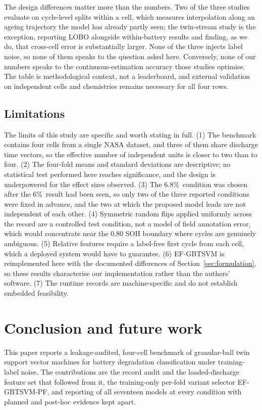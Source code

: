 \documentclass[final,5p,times,twocolumn]{elsarticle}
\newcommand{\proposed}{EF-GBTSVM-PF}
\newcommand{\nz}{\%}
\begin{document}
The design differences matter more than the numbers. Two of the three studies evaluate on cycle-level splits within a cell, which measures interpolation along an ageing trajectory the model has already partly seen; the twin-stream study is the exception, reporting LOBO alongside within-battery results and finding, as we do, that cross-cell error is substantially larger. None of the three injects label noise, so none of them speaks to the question asked here. Conversely, none of our numbers speaks to the continuous-estimation accuracy those studies optimise. The table is methodological context, not a leaderboard, and external validation on independent cells and chemistries remains necessary for all four rows.

\subsection{Limitations}\label{sec:limits}
The limits of this study are specific and worth stating in full. (1) The benchmark contains four cells from a single NASA dataset, and three of them share discharge time vectors, so the effective number of independent units is closer to two than to four. (2) The four-fold means and standard deviations are descriptive; no statistical test performed here reaches significance, and the design is underpowered for the effect sizes observed. (3) The 6.8\nz\ condition was chosen after the 6\nz\ result had been seen, so only two of the three reported conditions were fixed in advance, and the two at which the proposed model leads are not independent of each other. (4) Symmetric random flips applied uniformly across the record are a controlled test condition, not a model of field annotation error, which would concentrate near the 0.80 SOH boundary where cycles are genuinely ambiguous. (5) Relative features require a label-free first cycle from each cell, which a deployed system would have to guarantee. (6) EF-GBTSVM is reimplemented here with the documented differences of Section~\ref{sec:formulation}, so these results characterise our implementation rather than the authors' software. (7) The runtime records are machine-specific and do not establish embedded feasibility.

\section{Conclusion and future work}\label{sec:conc}
This paper reports a leakage-audited, four-cell benchmark of granular-ball twin support vector machines for battery degradation classification under training-label noise. The contributions are the record audit and the loaded-discharge feature set that followed from it, the training-only per-fold variant selector \proposed, and reporting of all seventeen models at every condition with planned and post-hoc evidence kept apart.
\end{document}
